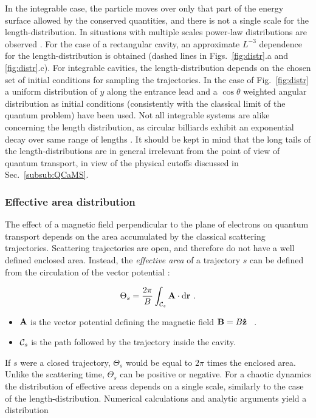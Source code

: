\documentclass[a4paper,10pt]{article}
\newcommand{\dif}{\mathrm{d}}
\newcommand{\nin}{\noindent}
\newcommand{\be}{\begin{equation}}
\newcommand{\ee}{\end{equation}}
\newcommand{\C}{{\cal C}}
\newcommand{\bA}{{\bf A}}
\newcommand{\bB}{{\bf B}}
\begin{document}
\nin In the integrable case, the particle moves over only that part
of the energy surface allowed by the conserved quantities, and there is not  a single scale for the length-distribution. In situations with multiple scales power-law distributions are observed \cite{Bau91,Mac92,Lai92}. For the case of a rectangular cavity, an approximate $L^{-3}$ dependence for the length-distribution is obtained (dashed lines in Figs.~\ref{fig:distr}.a and \ref{fig:distr}.c). For integrable cavities, the length-distribution depends on the chosen set of initial conditions for sampling the trajectories. In the case of Fig.~\ref{fig:distr} a uniform distribution of $y$ along the entrance lead and a $\cos{\theta}$ weighted angular distribution as initial conditions (consistently with the classical limit of the quantum problem) have been used. Not all integrable systems are alike concerning the length distribution, as circular billiards exhibit an exponential decay over same range of lengths \cite{Leg90,Lin93}. It should be kept in mind that the long tails of the length-distributions are in general irrelevant from the point of view of quantum transport, in view of the physical cutoffs discussed in Sec.~\ref{subsub:QCaMS}.

\subsubsection{Effective area distribution}

The effect of a magnetic field perpendicular to the plane of electrons on quantum transport depends on the area accumulated by the classical scattering trajectories. Scattering trajectories are open, and therefore do not have a well defined enclosed area. Instead, the {\it effective area} of a trajectory $s$ can be defined from the circulation of the vector potential : 

\be
\Theta_s = \frac{2 \pi}{B} \int_{\C_s} \bA \cdot \bf{\dif r} \ .
\label{eq:ea}
\ee
\begin{itemize}

\item $\bA$ is the vector potential defining the magnetic field 
$\bB=B \bf{\hat z}$ \ .

\item $\C_s$ is the path followed by the trajectory inside the cavity.

\end{itemize} 

\nin If $s$ were a closed trajectory, $\Theta_s$ would be equal
to $2\pi$ times the enclosed area. Unlike the scattering time, $\Theta_s$ can be positive or negative. For a chaotic dynamics the distribution of effective areas depends on a single scale, similarly to the case of the length-distribution. Numerical calculations and analytic arguments  \cite{Ber86,Jal90,Mac92,RamLech} yield a distribution 
\end{document}
